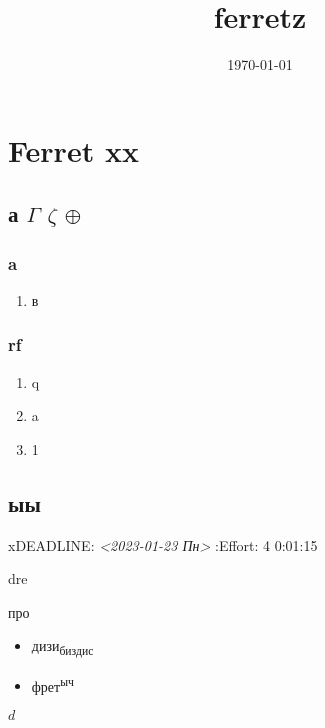\documentclass[11pt]{article}
\date{\today}
\title{ferretz}
\begin{document}
\maketitle
\tableofcontents


\section{Ferret \textbf{xx}}
\label{sec:orgbdef38a}
\subsection{а \(\Gamma\) \(\zeta\) \(\oplus\)}
\label{sec:orgf1eec45}
\subsubsection{a}
\label{sec:org269e66d}
\begin{enumerate}
\item в
\label{sec:org6ad6002}
\end{enumerate}
\subsubsection{rf}
\label{sec:orgd773277}
\begin{enumerate}
\item q
\label{sec:org893e5fd}
\item a
\label{sec:orgcfc2f85}
\item 1
\label{sec:orgaadcb7f}
\end{enumerate}
\subsection{ыы}
\label{sec:org5b0b7ec}
xDEADLINE: \textit{<2023-01-23 Пн>}
:Effort:   4
0:01:15
\begin{description}
\item[{0:02:07}] dre
\item[{0:02:33}] 

\item[{0:02:35}] 


\item про
\begin{itemize}
\item дизи\textsubscript{биздис}
\item фрет\textsuperscript{ыч}
\end{itemize}
\end{description}

$d$
\end{document}
